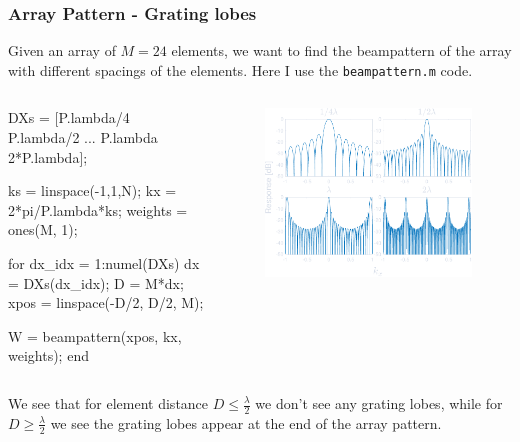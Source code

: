 \documentclass[compress]{beamer}
\begin{document}
\begin{frame}[fragile] %
    \frametitle{Array Pattern - Grating lobes}
    Given an array of $M=24$ elements, we want to find the beampattern of the array
    with different spacings of the elements. Here I use the \texttt{beampattern.m} code.
    \begin{columns}
        \begin{column}{0.52\textwidth}
            \begin{jllisting}[gobble=16, language=Matlab]
                DXs = [P.lambda/4   P.lambda/2 ...
                       P.lambda   2*P.lambda];

                ks = linspace(-1,1,N);
                kx = 2*pi/P.lambda*ks;
                weights = ones(M, 1);

                for dx_idx = 1:numel(DXs)
                    dx = DXs(dx_idx);
                    D = M*dx;
                    xpos = linspace(-D/2, D/2, M);
                    
                    W = beampattern(xpos, kx, weights);
                end
            \end{jllisting}
        \end{column}
        \begin{column}{0.5\textwidth}
            \begin{figure}
                \includegraphics[width=\columnwidth]{"../4.pdf"}
            \end{figure}
        \end{column}
    \end{columns}
    We see that for element distance $D \le \frac{λ}{2}$ we don't see any grating lobes,
    while for $D \ge \frac{λ}{2}$ we see the grating lobes appear at the end of the array
    pattern.
\end{frame}
\end{document}
